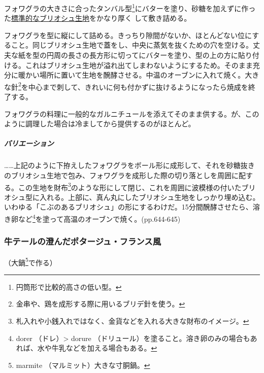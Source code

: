 フォワグラの大きさに合ったタンバル型\footnote{円筒形で比較的高さの低い型。}にバターを塗り、砂糖を加えずに作った\protect\hyperlink{pate-a-brioche-commune}{標準的なブリオシュ生地}をかなり厚く
して敷き詰める。

フォワグラを型に縦にして詰める。きっちり隙間がないか、ほとんどない位にすること。同じブリオシュ生地で蓋をし、中央に蒸気を抜くための穴を空ける。丈夫な紙を型の円周の長さの長方形に切ってにバターを塗り、型の上の方に貼り付ける。これはブリオシュ生地が溢れ出てしまわないようにするため。そのまま充分に暖かい場所に置いて生地を醗酵させる。中温のオーブンに入れて焼く。大きな針\footnote{金串や、鶏を成形する際に用いるブリデ針を使う。}を中心まで刺して、きれいに何も付かずに抜けるようになったら焼成を終了する。

フォワグラの料理に一般的なガルニチュールを添えてそのまま供する。が、このように調理した場合は冷ましてから提供するのがほとんど。

\hypertarget{ux30d0ux30eaux30a8ux30fcux30b7ux30e7ux30f3}{%
\subparagraph{バリエーション}\label{ux30d0ux30eaux30a8ux30fcux30b7ux30e7ux30f3}}

\ldots{}\ldots{}上記のように下拵えしたフォワグラをボール形に成形して、それを砂糖抜きのブリオシュ生地で包み、フォワグラを成形した際の切り落としを周囲に配する。この生地を財布\footnote{札入れや小銭入れではなく、金貨などを入れる大きな財布のイメージ。}のような形にして閉じ、これを周囲に波模様の付いたブリオシュ型に入れる。上部に、真ん丸にしたブリオシュ生地をしっかり埋め込む。いわゆる「こぶのあるブリオシュ」の形にするわけだ。15分間醗酵させたら、溶き卵など\footnote{dorer
  （ドレ）\textgreater{} dorure
  （ドリュール）を塗ること。溶き卵のみの場合もあれば、水や牛乳などを加える場合もある。}を塗って高温のオーブンで焼く。(pp.644-645)

\hypertarget{potage-queue-de-boeuf-a-la-francaise}{%
\subsubsection{牛テールの澄んだポタージュ・フランス風}\label{potage-queue-de-boeuf-a-la-francaise}}



（大鍋\footnote{marmite （マルミット）大きな寸胴鍋。}で作る）

